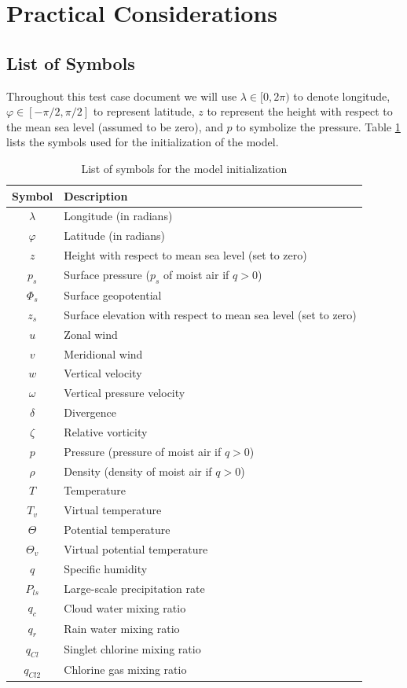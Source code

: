 \documentclass[times,doublespace]{fldauth}
\begin{document}
\section{Practical Considerations}

\subsection{List of Symbols}
Throughout this test case document we will use $\lambda \in [0, 2 \pi)$ to denote longitude, $\varphi \in [-\pi/2, \pi/2]$ to represent latitude, $z$ to represent the height with respect to the mean sea level (assumed to be zero), and $p$ to symbolize the pressure. Table \ref{tab:symbols} lists the symbols used for the initialization of the model.

\begin{table}[h]
\caption{List of symbols for the model initialization} \label{tab:symbols}
\begin{center}
\begin{tabular}{cl}
\hline Symbol & Description \\ \hline 
$\lambda$ & Longitude (in radians) \\
$\varphi$ & Latitude (in radians) \\
$z$ & Height with respect to mean sea level (set to zero) \\
$p_s$ & Surface pressure ($p_s$ of moist air if $q>0$) \\
$\Phi_s$ & Surface geopotential \\
$z_s$ & Surface elevation with respect to mean sea level (set to zero) \\
$u$ & Zonal wind \\
$v$ & Meridional wind \\
$w$ & Vertical velocity \\
$\omega$ & Vertical pressure velocity  \\
$\delta$ & Divergence\\
$\zeta$ & Relative vorticity\\
$p$ & Pressure (pressure of moist air if $q>0$) \\
$\rho$ & Density (density of moist air if $q>0$)\\
$T$ &Temperature \\
$T_v$ & Virtual temperature \\
$\Theta$ & Potential temperature \\
$\Theta_v$ & Virtual potential temperature \\
$q$ & Specific humidity \\
$P_{ls}$ & Large-scale precipitation rate \\
$q_c$ & Cloud water mixing ratio \\
$q_r$ & Rain water mixing ratio \\
$q_{Cl}$ & Singlet chlorine mixing ratio \\
$q_{Cl2}$ & Chlorine gas mixing ratio \\
\hline 
\end{tabular}
\end{center}
\end{table}
\end{document}
